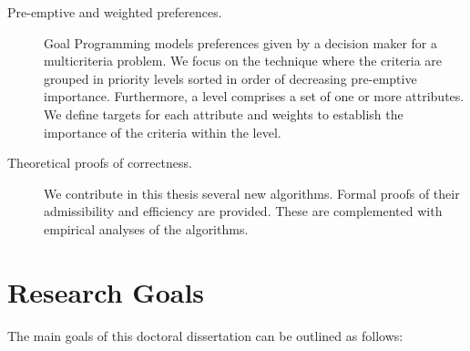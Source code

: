 \begin{description}
	\item[Pre-emptive and weighted preferences.] 
Goal Programming models preferences given by a decision maker for a multicriteria problem. We focus on the technique where the criteria are grouped in priority levels sorted in order of decreasing pre-emptive importance. Furthermore, a level comprises a set of one or more attributes. We define targets for each attribute and weights to establish the importance of the criteria within the level. 

	\item[Theoretical proofs of correctness.] We contribute in this thesis several new algorithms. Formal proofs of their admissibility and efficiency are provided. These are complemented with empirical analyses of the algorithms.

\end{description}

\section{Research Goals}
\label{ChapIntroduction:sec:objectives}

The main goals of this doctoral dissertation can be outlined as follows:

